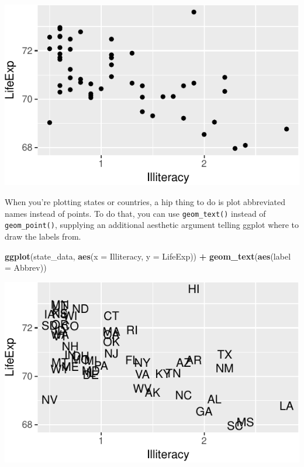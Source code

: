 \documentclass[12pt,oneside,openany]{book}
\newenvironment{Shaded}{\begin{snugshade}}{\end{snugshade}}
\newcommand{\KeywordTok}[1]{\textcolor[rgb]{0.13,0.29,0.53}{\textbf{#1}}}
\newcommand{\DataTypeTok}[1]{\textcolor[rgb]{0.13,0.29,0.53}{#1}}
\newcommand{\StringTok}[1]{\textcolor[rgb]{0.31,0.60,0.02}{#1}}
\newcommand{\OperatorTok}[1]{\textcolor[rgb]{0.81,0.36,0.00}{\textbf{#1}}}
\newcommand{\NormalTok}[1]{#1}
\begin{document}
\includegraphics{pdaps_files/figure-latex/scatter-1.pdf}

When you're plotting states or countries, a hip thing to do is plot
abbreviated names instead of points. To do that, you can use
\texttt{geom\_text()} instead of \texttt{geom\_point()}, supplying an
additional aesthetic argument telling ggplot where to draw the labels
from.

\begin{Shaded}
\begin{Highlighting}[]
\KeywordTok{ggplot}\NormalTok{(state_data, }\KeywordTok{aes}\NormalTok{(}\DataTypeTok{x =}\NormalTok{ Illiteracy, }\DataTypeTok{y =}\NormalTok{ LifeExp)) }\OperatorTok{+}
\StringTok{  }\KeywordTok{geom_text}\NormalTok{(}\KeywordTok{aes}\NormalTok{(}\DataTypeTok{label =}\NormalTok{ Abbrev))}
\end{Highlighting}
\end{Shaded}

\includegraphics{pdaps_files/figure-latex/scatter-text-1.pdf}
\end{document}

